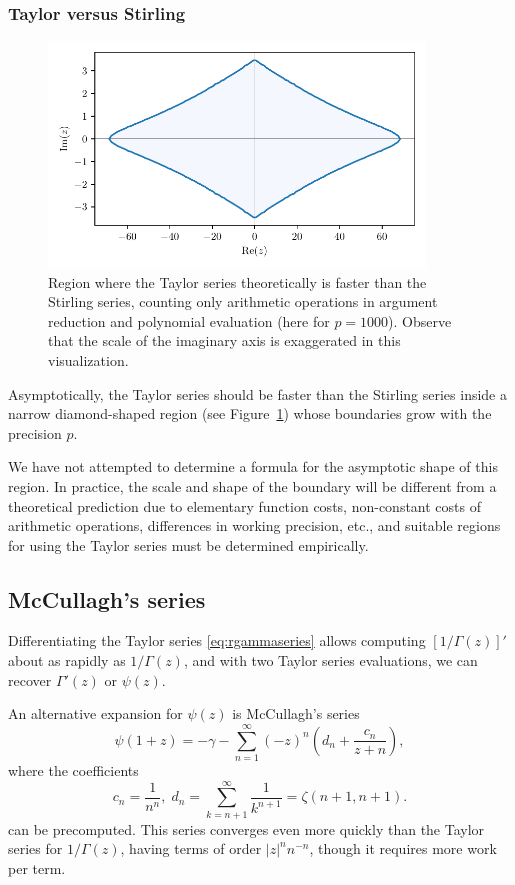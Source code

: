 \documentclass[reqno]{amsart}
\theoremstyle{definition}
\begin{document}
\subsubsection{Taylor versus Stirling}

\begin{figure}
\caption{Region where the Taylor series theoretically is faster than the Stirling series, counting only arithmetic operations in argument reduction and polynomial evaluation (here for $p = 1000$). Observe that the scale of the imaginary axis is exaggerated in this visualization. \label{fig:taylordiamond}}
\includegraphics[width=10cm]{diamond}
\end{figure}

Asymptotically, the Taylor series should be faster than the Stirling series
inside a narrow diamond-shaped region (see Figure~\ref{fig:taylordiamond})
whose boundaries grow with the precision $p$.

We have not attempted to determine a formula for the asymptotic shape of this region.
In practice, the scale and shape of the boundary will be different from
a theoretical prediction
due to elementary function costs, non-constant costs of arithmetic operations, differences in working precision, etc.,
and suitable regions for using the Taylor series must be determined empirically.

\subsection{McCullagh's series}

Differentiating the Taylor series \eqref{eq:rgammaseries} allows
computing $[1/\Gamma(z)]'$ about as rapidly as $1/\Gamma(z)$,
and with two Taylor series evaluations, we can recover $\Gamma'(z)$ or $\psi(z)$.

An alternative expansion for $\psi(z)$ is McCullagh's series~\cite{McCullagh1981} \cite[Section~18.2.7]{beebe2017mathematical}
\begin{equation}
\psi(1+z) = -\gamma - \sum_{n=1}^{\infty} (-z)^n \left( d_n + \frac{c_n}{z+n} \right),
\end{equation}
where the coefficients
\begin{equation}
c_n = \frac{1}{n^n}, \; d_n = \sum_{k=n+1}^{\infty} \frac{1}{k^{n+1}} = \zeta(n+1, n+1).
\end{equation}
can be precomputed.
This series converges even more quickly
than the Taylor series for $1/\Gamma(z)$,
having terms of order $|z|^n n^{-n}$,
though it requires more work per term.
\end{document}
